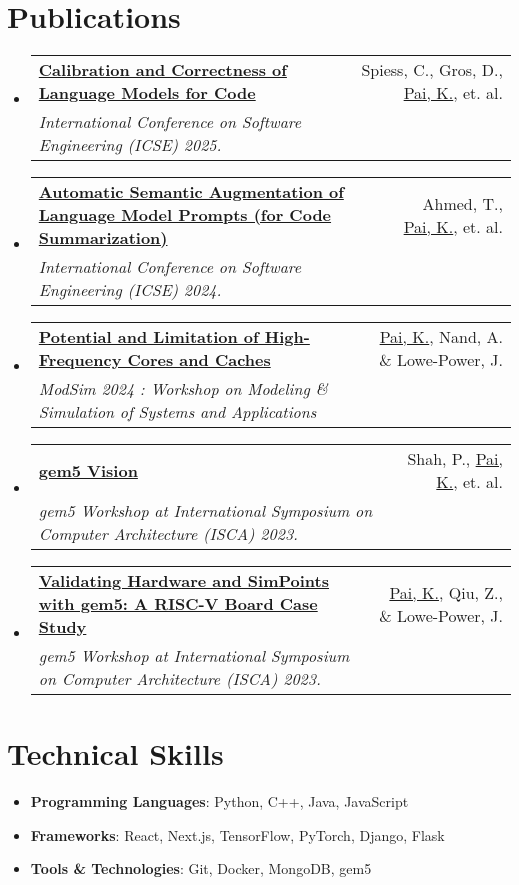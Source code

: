 \documentclass[letterpaper,10pt]{article}
\makeatletter
\newcommand{\resumeItem}[1]{\item\small{#1} \vspace{-3pt}}
\newcommand{\resumeSubheading}[4]{
\vspace{-1pt}\item
  \begin{tabular*}{0.97\textwidth}[t]{l@{\extracolsep{\fill}}r}
    \textbf{#1} & #2 \\
    \textit{#3} & \textit{#4} \\
  \end{tabular*}\vspace{-7pt}
}
\newcommand{\resumeSubHeadingList}{\begin{itemize}[leftmargin=0.15in, label={}]}
\newcommand{\resumeSubHeadingListEnd}{\end{itemize}}
\makeatother
\begin{document}
\section{Publications} %
\resumeSubHeadingList
  \resumeSubheading
      {\href{https://arxiv.org/pdf/2402.02047}{Calibration and Correctness of Language Models for Code}}{Spiess, C., Gros, D., \underline{Pai, K.}, et. al.}
      {International Conference on Software Engineering (ICSE) 2025.}{}
  \resumeSubheading
      {\href{https://dl.acm.org/doi/pdf/10.1145/3597503.3639183}{Automatic Semantic Augmentation of Language Model Prompts (for Code Summarization)}}{Ahmed, T., \underline{Pai, K.}, et. al.}
      {International Conference on Software Engineering (ICSE) 2024.}{}
  \resumeSubheading
      {\href{https://arch.cs.ucdavis.edu/simulation/2024/08/06/potentiallimitationhighfreqcorescaches.html}{Potential and Limitation of High-Frequency Cores and Caches}}{\underline{Pai, K.}, Nand, A. \& Lowe-Power, J.}
      {ModSim 2024 : Workshop on Modeling \& Simulation of Systems and Applications}{}
  \resumeSubheading
      {\href{https://www.gem5.org/assets/files/workshop-isca-2023/posters/gem5-vision-poster.pdf}{gem5 Vision}}{Shah, P., \underline{Pai, K.}, et. al.}
      {gem5 Workshop at International Symposium on Computer Architecture (ISCA) 2023.}{}
  \resumeSubheading
      {\href{https://www.gem5.org/assets/files/workshop-isca-2023/posters/validating-hardware-and-simpoints-with-gem5-poster.pdf}{Validating Hardware and SimPoints with gem5: A RISC-V Board Case Study}}{\underline{Pai, K.}, Qiu, Z., \& Lowe-Power, J.}
      {gem5 Workshop at International Symposium on Computer Architecture (ISCA) 2023.}{}
\resumeSubHeadingListEnd

\section{Technical Skills}
\resumeSubHeadingList
    \resumeItem{\textbf{Programming Languages}: Python, C++, Java, JavaScript}
    \resumeItem{\textbf{Frameworks}: React, Next.js, TensorFlow, PyTorch, Django, Flask}
    \resumeItem{\textbf{Tools \& Technologies}: Git, Docker, MongoDB, gem5}
\resumeSubHeadingListEnd

\end{document}
